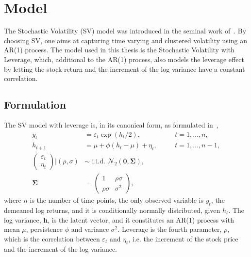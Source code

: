 \newcommand*{\yts}{y_t^\ast}
\newcommand*{\ets}{\varepsilon_t^\ast}

\section{Model}

The Stochastic Volatility (SV) model was introduced in the seminal work of~\citet{taylor1982financial}.
By choosing SV, one aims at capturing time varying and clustered volatility using an AR(1) process.
The model used in this thesis is the Stochastic Volatility with Leverage, which, additional to the AR(1) process, also models the leverage effect by letting the stock return and the increment of the log variance have a constant correlation.

\subsection{Formulation}

The SV model with leverage is, in its canonical form, as formulated in~\citet{Omori2007},
\begin{equation}
\begin{alignedat}{2}\label{form:orig_model}
y_t & = \varepsilon_t\exp\left(h_t/2\right), && \quad t=1,\dots,n, \\
h_{t+1} & = \mu+\phi(h_t-\mu)+\eta_t, && \quad t=1,\dots,n-1, \\
\begin{pmatrix}
\varepsilon_t \\
\eta_t
\end{pmatrix}
\bigg\vert\left(\rho,\sigma\right) & \sim\text{ i.i.d. }\mathcal{N}_2\left(\bm{0},\bm{\Sigma}\right), \\
\bm{\Sigma} & =
\begin{pmatrix}
1 & \rho\sigma \\
\rho\sigma & \sigma^2
\end{pmatrix},
\end{alignedat}
\end{equation}
where $n$ is the number of time points, the only observed variable is $y_t$, the demeaned log returns, and it is conditionally normally distributed, given $h_t$.
The log variance, $\bm{h}$, is the latent vector, and it constitutes an AR(1) process with mean $\mu$, persistence $\phi$ and variance $\sigma^2$.
Leverage is the fourth parameter, $\rho$, which is the correlation between $\varepsilon_t$ and $\eta_t$, i.e. the increment of the stock price and the increment of the log variance.

